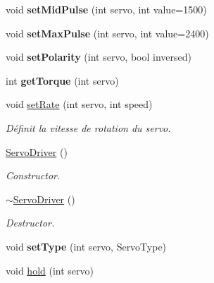 \begin{DoxyCompactItemize}
void {\bfseries set\+Mid\+Pulse} (int servo, int value=1500)
\item 
\mbox{\label{classServoDriver_aaaeaab97cef5c2ebcd05c265fdff747f}} 
void {\bfseries set\+Max\+Pulse} (int servo, int value=2400)
\item 
\mbox{\label{classServoDriver_a89b2add38109f20260369e0a0d747bf2}} 
void {\bfseries set\+Polarity} (int servo, bool inversed)
\item 
\mbox{\label{classServoDriver_a108cce4f0dcf60bf443ee932621bc89c}} 
int {\bfseries get\+Torque} (int servo)
\item 
\mbox{\label{classServoDriver_a5a10cd45849dea884d98046a5e8180ab}} 
void \hyperlink{classServoDriver_a5a10cd45849dea884d98046a5e8180ab}{set\+Rate} (int servo, int speed)
\begin{DoxyCompactList}\small\item\em Définit la vitesse de rotation du servo. \end{DoxyCompactList}\item 
\mbox{\label{classServoDriver_a2076bae148e26ee3f854f1f1984d9714}} 
\hyperlink{classServoDriver_a2076bae148e26ee3f854f1f1984d9714}{Servo\+Driver} ()
\begin{DoxyCompactList}\small\item\em Constructor. \end{DoxyCompactList}\item 
\mbox{\label{classServoDriver_acf6cad7d5b891fbe4ff44eaec8409db7}} 
\hyperlink{classServoDriver_acf6cad7d5b891fbe4ff44eaec8409db7}{$\sim$\+Servo\+Driver} ()
\begin{DoxyCompactList}\small\item\em Destructor. \end{DoxyCompactList}\item 
\mbox{\label{classServoDriver_a5ca0f58290fa29ae484fe4a5077a1c8e}} 
void {\bfseries set\+Type} (int servo, Servo\+Type)
\item 
\mbox{\label{classServoDriver_af580283b3d1765c9a27276e9a870cf88}} 
void \hyperlink{classServoDriver_af580283b3d1765c9a27276e9a870cf88}{hold} (int servo)

\end{DoxyCompactItemize}
